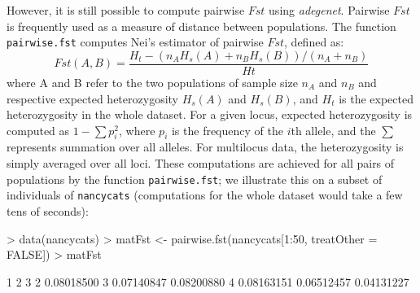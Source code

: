 \documentclass{article}
\begin{document}





However, it is still possible to compute pairwise $Fst$ using \textit{adegenet}.
Pairwise $Fst$ is frequently used as a measure of distance between populations.
The function \texttt{pairwise.fst} computes Nei's estimator \cite{tj814} of pairwise $Fst$, defined as:
$$
Fst(A,B) = \frac{H_t - (n_AH_s(A) + n_BH_s(B))/(n_A + n_B)}{Ht}
$$
where A and B refer to the two populations of sample size $n_A$ and $n_B$ and respective
expected heterozygosity $H_s(A)$ and $H_s(B)$, and $H_t$ is the expected heterozygosity in the whole dataset.
For a given locus, expected heterozygosity is computed as $1 - \sum p_i^2$, where $p_i$ is the
frequency of the $i$th allele, and the $\sum$ represents summation over all alleles.
For multilocus data, the heterozygosity is simply averaged over all loci.
These computations are achieved for all pairs of populations by the function \texttt{pairwise.fst}; we
illustrate this on a subset of individuals of \texttt{nancycats} (computations for the whole dataset
would take a few tens of seconds):
\begin{Schunk}
\begin{Sinput}
> data(nancycats)
> matFst <- pairwise.fst(nancycats[1:50, treatOther = FALSE])
> matFst
\end{Sinput}
\begin{Soutput}
           1          2          3
2 0.08018500                      
3 0.07140847 0.08200880           
4 0.08163151 0.06512457 0.04131227
\end{Soutput}
\end{Schunk}
\end{document}
